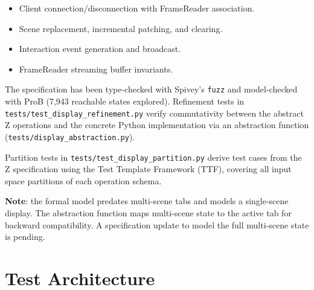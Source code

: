 \documentclass[a4paper,10pt]{article}
\begin{document}
\begin{itemize}
  \item Client connection/disconnection with FrameReader association.
  \item Scene replacement, incremental patching, and clearing.
  \item Interaction event generation and broadcast.
  \item FrameReader streaming buffer invariants.
\end{itemize}

The specification has been type-checked with Spivey's \texttt{fuzz}
and model-checked with ProB (7{,}943 reachable states explored).
Refinement tests in \texttt{tests/test\_display\_refinement.py}
verify commutativity between the abstract Z operations and the
concrete Python implementation via an abstraction function
(\texttt{tests/display\_abstraction.py}).

Partition tests in \texttt{tests/test\_display\_partition.py} derive
test cases from the Z specification using the Test Template Framework
(TTF), covering all input space partitions of each operation schema.

\textbf{Note}: the formal model predates multi-scene tabs and models
a single-scene display.  The abstraction function maps multi-scene
state to the active tab for backward compatibility.  A specification
update to model the full multi-scene state is pending.

\section{Test Architecture}
\end{document}
